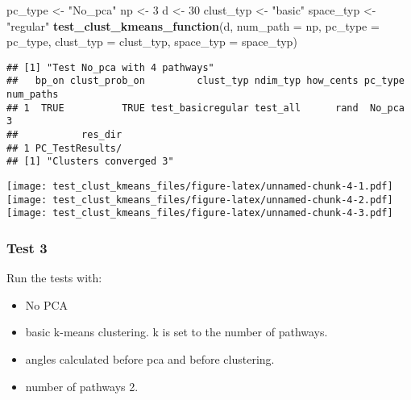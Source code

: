 \documentclass[
]{article}
\newenvironment{Shaded}{\begin{snugshade}}{\end{snugshade}}
\newcommand{\AttributeTok}[1]{\textcolor[rgb]{0.13,0.29,0.53}{#1}}
\newcommand{\DecValTok}[1]{\textcolor[rgb]{0.00,0.00,0.81}{#1}}
\newcommand{\FunctionTok}[1]{\textcolor[rgb]{0.13,0.29,0.53}{\textbf{#1}}}
\newcommand{\NormalTok}[1]{#1}
\newcommand{\OtherTok}[1]{\textcolor[rgb]{0.56,0.35,0.01}{#1}}
\newcommand{\StringTok}[1]{\textcolor[rgb]{0.31,0.60,0.02}{#1}}
\providecommand{\tightlist}{%
  \setlength{\itemsep}{0pt}\setlength{\parskip}{0pt}}
\begin{document}
\begin{Shaded}
\begin{Highlighting}[]
\NormalTok{pc\_type }\OtherTok{\textless{}{-}} \StringTok{"No\_pca"}
\NormalTok{np }\OtherTok{\textless{}{-}} \DecValTok{3}
\NormalTok{d }\OtherTok{\textless{}{-}} \DecValTok{30}
\NormalTok{clust\_typ }\OtherTok{\textless{}{-}} \StringTok{"basic"}
\NormalTok{space\_typ }\OtherTok{\textless{}{-}} \StringTok{"regular"}
\FunctionTok{test\_clust\_kmeans\_function}\NormalTok{(d,}
                           \AttributeTok{num\_path =}\NormalTok{ np,}
                           \AttributeTok{pc\_type =}\NormalTok{ pc\_type,}
                           \AttributeTok{clust\_typ =}\NormalTok{ clust\_typ,}
                           \AttributeTok{space\_typ =}\NormalTok{ space\_typ)}
\end{Highlighting}
\end{Shaded}

\begin{verbatim}
## [1] "Test No_pca with 4 pathways"
##   bp_on clust_prob_on         clust_typ ndim_typ how_cents pc_type num_paths
## 1  TRUE          TRUE test_basicregular test_all      rand  No_pca         3
##           res_dir
## 1 PC_TestResults/
## [1] "Clusters converged 3"
\end{verbatim}

\texttt{[image: test\_clust\_kmeans\_files/figure-latex/unnamed-chunk-4-1.pdf]}
\texttt{[image: test\_clust\_kmeans\_files/figure-latex/unnamed-chunk-4-2.pdf]}
\texttt{[image: test\_clust\_kmeans\_files/figure-latex/unnamed-chunk-4-3.pdf]}

\hypertarget{test-3}{%
\subsubsection{Test 3}\label{test-3}}

Run the tests with:

\begin{itemize}
\tightlist
\item
  No PCA
\item
  basic k-means clustering. k is set to the number of pathways.
\item
  angles calculated before pca and before clustering.
\item
  number of pathways 2.
\end{itemize}
\end{document}
